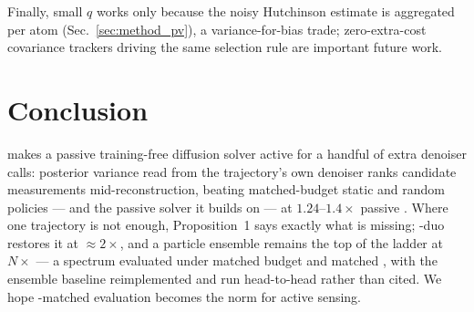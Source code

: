 Finally, small $q$ works only because the noisy Hutchinson estimate is
aggregated per atom (Sec.~\ref{sec:method_pv}), a variance-for-bias
trade; zero-extra-cost covariance trackers \cite{rissanen2025freehunch}
driving the same selection rule are important future work.

\section{Conclusion}\label{sec:conclusion}

\pvas{} makes a passive training-free diffusion solver active for a
handful of extra denoiser calls: posterior variance read from the
trajectory's own denoiser ranks candidate measurements
mid-reconstruction, beating matched-budget static and random policies
--- and the passive solver it builds on --- at $1.24$--$1.4\times$
passive \nfe. Where one trajectory is not enough, Proposition~1 says
exactly what is missing; \pvas-duo restores it at ${\approx}2\times$,
and a particle ensemble remains the top of the ladder at $N\times$ ---
a spectrum evaluated under matched budget and matched \nfe, with the
ensemble baseline reimplemented and run head-to-head rather than
cited. We hope \nfe-matched evaluation becomes the norm for active
sensing.
